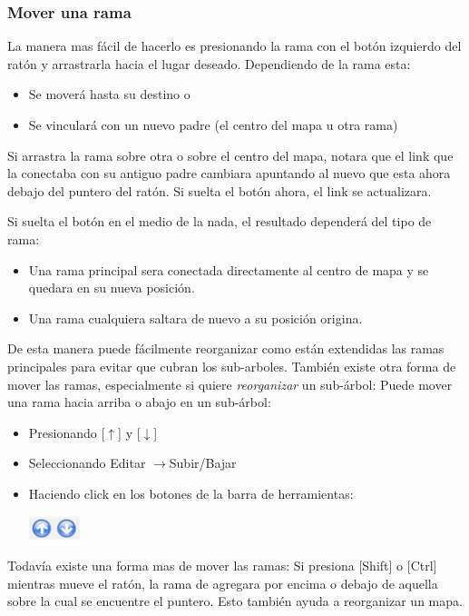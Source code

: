 \documentclass{article}
\newcommand{\ra}{$\longrightarrow$}
\newcommand{\ua}{$\uparrow$}
\newcommand{\da}{$\downarrow$}
\newcommand{\key}[1]{[#1]}
\begin{document}
\subsubsection*{Mover una rama}
La manera mas f\'acil de hacerlo es presionando la rama con el bot\'on izquierdo del rat\'on y arrastrarla hacia el lugar deseado. Dependiendo de la rama esta:
\begin{itemize}
    \item Se mover\'a hasta su destino o
    \item Se vincular\'a con un nuevo padre (el centro del mapa u otra rama)
\end{itemize}
Si arrastra la rama sobre otra o sobre el centro del mapa, notara que el link que la conectaba con su antiguo padre cambiara apuntando al nuevo que esta ahora debajo del puntero del rat\'on. Si suelta el bot\'on ahora, el link se actualizara.

Si suelta el bot\'on en el medio de la nada, el resultado depender\'a del tipo de rama:
\begin{itemize}
    \item Una rama principal sera conectada directamente al centro de mapa y se quedara en su nueva posici\'on.
    \item Una rama cualquiera saltara de nuevo a su posici\'on origina.
\end{itemize}
De esta manera puede f\'acilmente reorganizar como est\'an extendidas las ramas principales para evitar que cubran los sub-arboles. Tambi\'en existe otra forma de mover las ramas, especialmente si quiere {\em reorganizar} un sub-\'arbol: Puede mover una rama hacia arriba o abajo en un sub-\'arbol:

\begin{itemize}
    \item Presionando \key{\ua} y \key {\da}
    \item Seleccionando Editar \ra Subir/Bajar
    \item Haciendo click en los botones de la barra de herramientas:
        \begin{center}
            \includegraphics[width=1.5cm]{images/move-buttons.png}
        \end{center}    
\end{itemize}
Todav\'ia existe una forma mas de mover las ramas: Si presiona \key{Shift} o
\key{Ctrl} mientras mueve el rat\'on, la rama de agregara por encima o debajo de aquella sobre la cual se encuentre el puntero. Esto tambi\'en ayuda a reorganizar un mapa.
\end{document}
